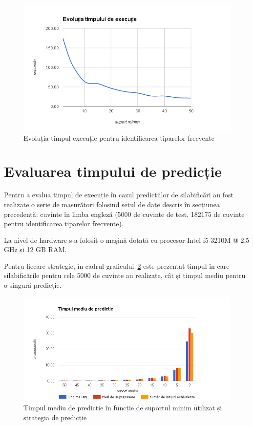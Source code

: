 \begin{figure}[h!]
    \centering
    \includegraphics[width=.9\textwidth]{figures/bide-runtime-en.png}
    \caption{Evoluția timpul execuție pentru identificarea tiparelor frecvente}
    \label{fig:bide-runtime-en}
\end{figure}



\section{Evaluarea timpului de predicție}

Pentru a evalua timpul de execuție în cazul predicțiilor de silabificări au fost realizate o serie de masurători folosind setul de date descris în secțiunea precedentă: cuvinte în limba engleză (5000 de cuvinte de test, 182175 de cuvinte pentru identificarea tiparelor frecvente). 

La nivel de hardware s-a folosit o mașină dotată cu procesor Intel i5-3210M @ 2,5 GHz și 12 GB RAM.

Pentru fiecare strategie, în cadrul graficului~\ref{fig:runtime} este prezentat timpul în care silabificările pentru cele 5000 de cuvinte au realizate, cât și timpul mediu pentru o singură predicție.

\begin{figure}[h!]
    \centering
    \includegraphics[width=1\textwidth]{figures/runtime.png}
    \caption{Timpul mediu de predicție în funcție de suportul minim utilizat și strategia de predicție}
    \label{fig:runtime}
\end{figure}

